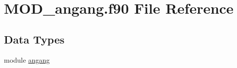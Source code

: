 \hypertarget{MOD__angang_8f90}{\section{M\-O\-D\-\_\-angang.\-f90 File Reference}
\label{MOD__angang_8f90}
}
\subsection*{Data Types}
\begin{DoxyCompactItemize}
\item 
module \hyperlink{classangang}{angang}
\end{DoxyCompactItemize}
